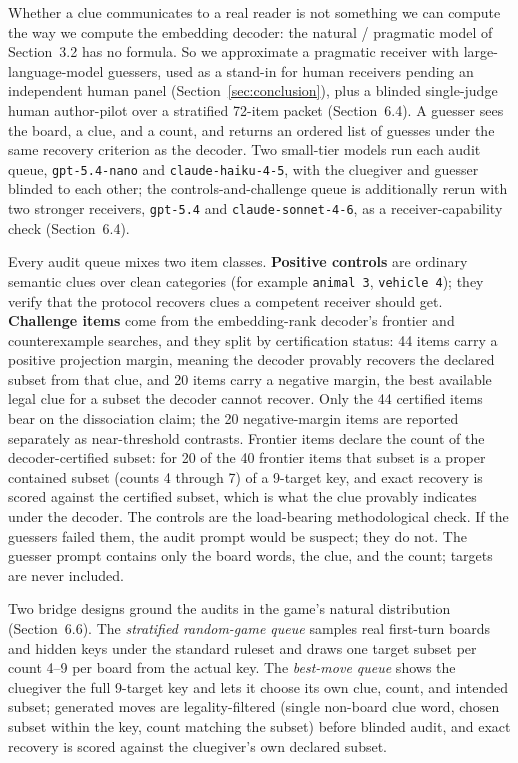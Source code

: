 \documentclass[11pt]{article}
\begin{document}
Whether a clue communicates to a real reader is not something we can compute the
way we compute the embedding decoder: the natural / pragmatic model of
Section~3.2 has no formula. So we approximate
a pragmatic receiver with large-language-model guessers, used as a stand-in for
human receivers pending an independent human panel (Section~\ref{sec:conclusion}),
plus a blinded single-judge human author-pilot over a stratified 72-item packet
(Section~6.4). A guesser sees the board, a clue, and a count, and returns an
ordered list of guesses under the same recovery criterion as the decoder. Two
small-tier models run each audit queue, \texttt{gpt-5.4-nano} and
\texttt{claude-haiku-4-5}, with the cluegiver and guesser blinded to each other;
the controls-and-challenge queue is additionally rerun with two stronger
receivers, \texttt{gpt-5.4} and \texttt{claude-sonnet-4-6}, as a
receiver-capability check (Section~6.4).

Every audit queue mixes two item classes. \textbf{Positive controls} are ordinary
semantic clues over clean categories (for example \texttt{animal 3},
\texttt{vehicle 4}); they verify that the protocol recovers clues a competent
receiver should get. \textbf{Challenge items} come from the embedding-rank
decoder's frontier and counterexample searches, and they split by certification
status: 44 items carry a positive projection margin, meaning the decoder provably
recovers the declared subset from that clue, and 20 items carry a negative margin,
the best available legal clue for a subset the decoder cannot recover. Only the 44
certified items bear on the dissociation claim; the 20 negative-margin items are
reported separately as near-threshold contrasts. Frontier items declare the count
of the decoder-certified subset: for 20 of the 40 frontier items that subset is a
proper contained subset (counts 4 through 7) of a 9-target key, and exact recovery
is scored against the certified subset, which is what the clue provably indicates
under the decoder. The controls are the load-bearing methodological check. If the
guessers failed them, the audit prompt would be suspect; they do not. The guesser
prompt contains only the board words, the clue, and the count; targets are never
included.

Two bridge designs ground the audits in the game's natural distribution
(Section~6.6). The \emph{stratified random-game queue} samples real first-turn
boards and hidden keys under the standard ruleset and draws one target subset per
count 4--9 per board from the actual key. The \emph{best-move queue} shows the
cluegiver the full 9-target key and lets it choose its own clue, count, and
intended subset; generated moves are legality-filtered (single non-board clue
word, chosen subset within the key, count matching the subset) before blinded
audit, and exact recovery is scored against the cluegiver's own declared subset.
\end{document}
